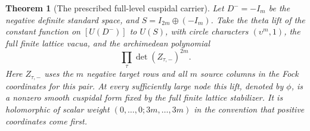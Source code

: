 \documentclass[a4paper,11pt]{article}
\newtheorem{theorem}[proposition]{Theorem}
\theoremstyle{definition}
\theoremstyle{remark}
\numberwithin{equation}{section}
\begin{document}
\begin{theorem}[The prescribed full-level cuspidal carrier]
\leavevmode\label{thm:carrier813}
Let \(D^-=-I_m\) be the negative definite standard space,
and \(S=I_{2m}\oplus(-I_m)\). Take the theta lift of the
constant function on \([U(D^-)]\) to \(U(S)\), with circle
characters \((\upsilon^m,1)\), the full finite lattice
vacua, and the archimedean polynomial
\[
          \prod_\tau \det(Z_{\tau,-})^{2m}.
\]
Here \(Z_{\tau,-}\) uses the \(m\) negative target rows and
all \(m\) source columns in the Fock coordinates for this
pair. At every sufficiently large node this lift, denoted
by \(\phi\), is a nonzero smooth cuspidal form fixed by the
full finite lattice stabilizer. It is holomorphic of scalar
weight \((0,\ldots,0;3m,\ldots,3m)\) in the convention that
positive coordinates come first.
\end{theorem}
\end{document}
